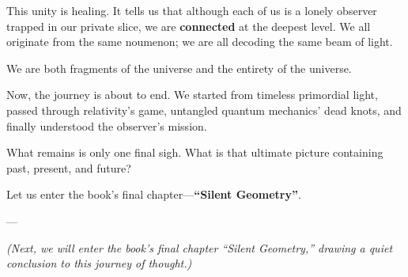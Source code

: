 This unity is healing. It tells us that although each of us is a lonely observer trapped in our private slice, we are \textbf{connected} at the deepest level. We all originate from the same noumenon; we are all decoding the same beam of light.

We are both fragments of the universe and the entirety of the universe.

Now, the journey is about to end. We started from timeless primordial light, passed through relativity's game, untangled quantum mechanics' dead knots, and finally understood the observer's mission.

What remains is only one final sigh. What is that ultimate picture containing past, present, and future?

Let us enter the book's final chapter---\textbf{``Silent Geometry''}.

---

\textit{(Next, we will enter the book's final chapter ``Silent Geometry,'' drawing a quiet conclusion to this journey of thought.)}

